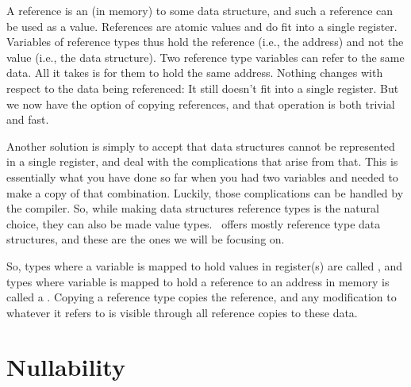 A reference is an  (in memory) to some data structure, and such a reference can be used as a value. References are atomic values and do fit into a single register. Variables of reference types thus hold the reference (i.e., the address) and not the value (i.e., the data structure). Two reference type variables can refer to the same data. All it takes is for them to hold the same address. Nothing changes with respect to the data being referenced: It still doesn't fit into a single register. But we now have the option of copying references, and that operation is both trivial and fast.

Another solution is simply to accept that data structures cannot be represented in a single register, and deal with the complications that arise from that. This is essentially what you have done so far when you had two variables and needed to make a copy of that combination. Luckily, those complications can be handled by the compiler. So, while making data structures reference types is the natural choice, they can also be made value types. \csharp\ offers mostly reference type data structures, and these are the ones we will be focusing on.

So, types where a variable is mapped to hold values in register(s) are called , and types where variable is mapped to hold a reference to an address in memory is called a . Copying a reference type copies the reference, and any modification to whatever it refers to is visible through all reference copies to these data.

\section{Nullability}

